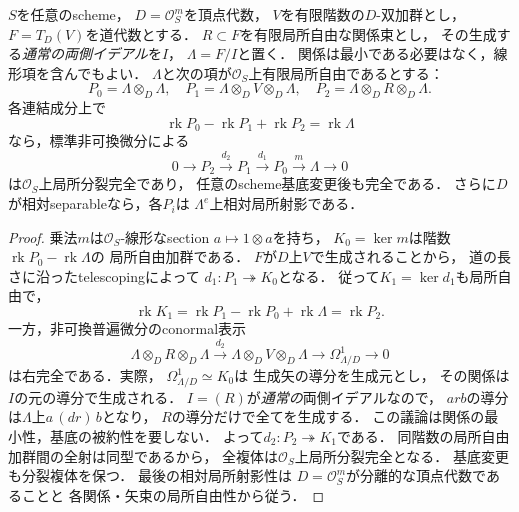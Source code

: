 \begin{lemma}
\label{lem:qa-relative-euler-conormal-diagonal}
$S$を任意のscheme，
$D=\mathcal O_S^m$を頂点代数，
$V$を有限階数の$D$-双加群とし，
$F=T_D(V)$を道代数とする．
$R\subset F$を有限局所自由な関係束とし，
その生成する\emph{通常の両側イデアル}を$I$，
$\Lambda=F/I$と置く．
関係は最小である必要はなく，線形項を含んでもよい．
$\Lambda$と次の項が$\mathcal O_S$上有限局所自由であるとする：
\[
 P_0=\Lambda\otimes_D\Lambda,\quad
 P_1=\Lambda\otimes_DV\otimes_D\Lambda,\quad
 P_2=\Lambda\otimes_DR\otimes_D\Lambda .
\]
各連結成分上で
\[
 \operatorname{rk}P_0-\operatorname{rk}P_1+
 \operatorname{rk}P_2=\operatorname{rk}\Lambda
 \tag{EC}\label{eq:qa-euler-conormal-criterion}
\]
なら，標準非可換微分による
\[
 0\to P_2\xrightarrow{d_2}P_1\xrightarrow{d_1}
 P_0\xrightarrow{m}\Lambda\to0
\]
は$\mathcal O_S$上局所分裂完全であり，
任意のscheme基底変更後も完全である．
さらに$D$が相対separableなら，各$P_i$は
$\Lambda^e$上相対局所射影である．
\end{lemma}
\begin{proof}
乗法$m$は$\mathcal O_S$-線形なsection
$a\mapsto1\otimes a$を持ち，
$K_0=\ker m$は階数
$\operatorname{rk}P_0-\operatorname{rk}\Lambda$の
局所自由加群である．
$F$が$D$上$V$で生成されることから，
道の長さに沿ったtelescopingによって
$d_1:P_1\twoheadrightarrow K_0$となる．
従って$K_1=\ker d_1$も局所自由で，
\[
 \operatorname{rk}K_1
 =\operatorname{rk}P_1-\operatorname{rk}P_0
    +\operatorname{rk}\Lambda
 =\operatorname{rk}P_2.
\]
一方，非可換普遍微分のconormal表示
\[
 \Lambda\otimes_D R\otimes_D\Lambda
 \xrightarrow{d_2}
 \Lambda\otimes_D V\otimes_D\Lambda
 \longrightarrow\Omega^1_{\Lambda/D}\longrightarrow0
\]
は右完全である．実際，
$\Omega^1_{\Lambda/D}\simeq K_0$は
生成矢の導分を生成元とし，
その関係は$I$の元の導分で生成される．
$I=(R)$が\emph{通常の}両側イデアルなので，
$a r b$の導分は$\Lambda$上$a\,(dr)\,b$となり，
$R$の導分だけで全てを生成する．
この議論は関係の最小性，基底の被約性を要しない．
よって$d_2:P_2\twoheadrightarrow K_1$である．
同階数の局所自由加群間の全射は同型であるから，
全複体は$\mathcal O_S$上局所分裂完全となる．
基底変更も分裂複体を保つ．
最後の相対局所射影性は
$D=\mathcal O_S^m$が分離的な頂点代数であることと
各関係・矢束の局所自由性から従う．
\end{proof}

